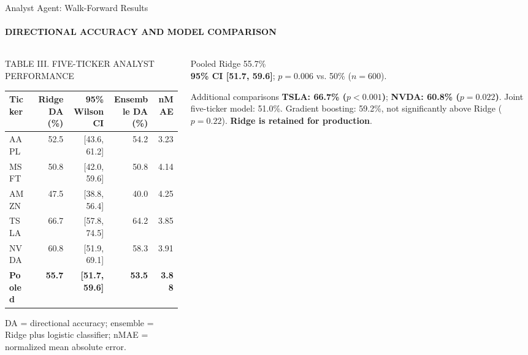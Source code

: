 \documentclass[aspectratio=169,11pt]{beamer}
\newcommand{\keyphrase}[1]{\textbf{\color{DELCONred}#1}}
\begin{document}
\begin{frame}{Analyst Agent: Walk-Forward Results}
  \framesubtitle{DIRECTIONAL ACCURACY AND MODEL COMPARISON}
  \begin{columns}[T,onlytextwidth]
    \begin{column}{0.65\textwidth}
      \begin{block}{TABLE III. FIVE-TICKER ANALYST PERFORMANCE}
        \centering\scriptsize
        \begin{tabular}{lrrrr}
          \toprule
          Ticker & Ridge DA (\%) & 95\% Wilson CI & Ensemble DA (\%) & nMAE \\
          \midrule
          AAPL & 52.5 & [43.6, 61.2] & 54.2 & 3.23 \\
          MSFT & 50.8 & [42.0, 59.6] & 50.8 & 4.14 \\
          AMZN & 47.5 & [38.8, 56.4] & 40.0 & 4.25 \\
          TSLA & 66.7 & [57.8, 74.5] & 64.2 & 3.85 \\
          NVDA & 60.8 & [51.9, 69.1] & 58.3 & 3.91 \\
          \textbf{Pooled} & \textbf{55.7} & \textbf{[51.7, 59.6]} & \textbf{53.5} & \textbf{3.88} \\
          \bottomrule
        \end{tabular}
        \par\tiny DA = directional accuracy; ensemble = Ridge plus logistic classifier; nMAE = normalized mean absolute error.
      \end{block}
    \end{column}
    \begin{column}{0.32\textwidth}
      \begin{alertblock}{Pooled Ridge}
        \centering\Large 55.7\%\\[-0.1em]
        \scriptsize \keyphrase{95\% CI [51.7, 59.6]}; $p=0.006$ vs. 50\% ($n=600$).
      \end{alertblock}
      \begin{block}{Additional comparisons}
        \scriptsize \keyphrase{TSLA: 66.7\% ($p<0.001$)}; \keyphrase{NVDA: 60.8\% ($p=0.022$)}. Joint five-ticker model: 51.0\%. Gradient boosting: 59.2\%, not significantly above Ridge ($p=0.22$). \keyphrase{Ridge is retained for production}.
      \end{block}
    \end{column}
  \end{columns}
\end{frame}
\end{document}
